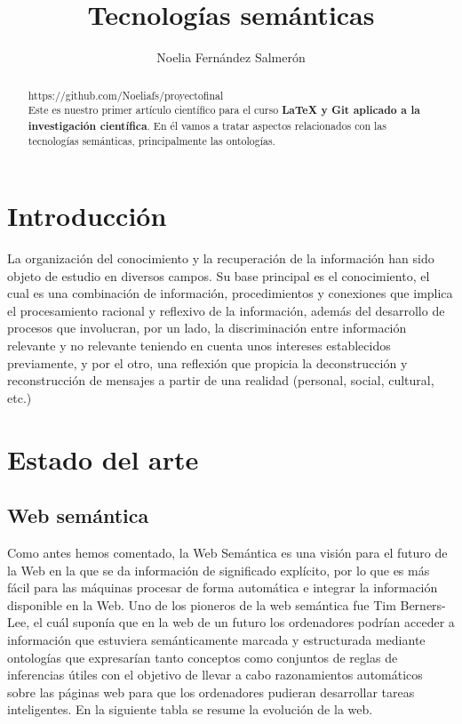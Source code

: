 \documentclass{article}
\title{Tecnologías semánticas}
\author{Noelia Fernández Salmerón }
\begin{document}
\maketitle
\begin{abstract}
https://github.com/Noeliafs/proyectofinal\\
Este es nuestro primer artículo científico para el curso {\bf LaTeX y Git aplicado a la investigación científica}. En él vamos a tratar aspectos relacionados con las tecnologías semánticas, principalmente las ontologías.
\end{abstract}
\section{Introducción}
La organización del conocimiento y la recuperación de la información han sido objeto de estudio en diversos campos. Su base principal es el conocimiento, el cual es una combinación de información, procedimientos y conexiones que implica el procesamiento racional y reflexivo de la información, además del desarrollo de procesos que involucran, por un lado, la discriminación entre información relevante y no relevante teniendo en cuenta unos intereses establecidos previamente, y por el otro, una reflexión que propicia la deconstrucción y reconstrucción de mensajes a partir de una
realidad (personal, social, cultural, etc.) 


\section{Estado del arte}
\subsection{Web semántica}
Como antes hemos comentado, la Web Semántica es una visión para el futuro de la Web en la que se da información de significado explícito, por lo que es más fácil para las máquinas procesar de forma automática e integrar la información disponible en la Web. Uno de los pioneros de la web semántica fue Tim Berners-Lee, el cuál suponía que en la web de un futuro los ordenadores podrían acceder a información que estuviera semánticamente marcada y estructurada mediante ontologías que expresarían tanto conceptos como conjuntos de reglas de inferencias útiles con el objetivo de llevar a cabo razonamientos automáticos sobre las páginas web para que los ordenadores pudieran desarrollar tareas inteligentes. En la siguiente tabla se resume la evolución de la web.
\end{document}
